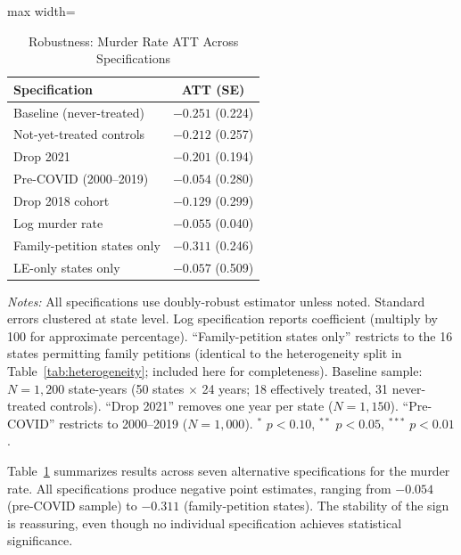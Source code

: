 \documentclass[12pt]{article}
\begin{document}
\begin{table}[H]
\centering
\caption{Robustness: Murder Rate ATT Across Specifications}
\label{tab:robustness}
\begin{adjustbox}{max width=\textwidth}
\begin{threeparttable}
\begin{tabular}{lc}
\toprule
Specification & ATT (SE) \\
\midrule
Baseline (never-treated) & $-0.251$ (0.224) \\
Not-yet-treated controls & $-0.212$ (0.257) \\
Drop 2021 & $-0.201$ (0.194) \\
Pre-COVID (2000--2019) & $-0.054$ (0.280) \\
Drop 2018 cohort & $-0.129$ (0.299) \\
Log murder rate & $-0.055$ (0.040) \\
Family-petition states only & $-0.311$ (0.246) \\
LE-only states only & $-0.057$ (0.509) \\
\bottomrule
\end{tabular}
\begin{tablenotes}[flushleft]
\small
\item \textit{Notes:} All specifications use \citet{callaway2021difference} doubly-robust estimator unless noted. Standard errors clustered at state level. Log specification reports coefficient (multiply by 100 for approximate percentage). ``Family-petition states only'' restricts to the 16 states permitting family petitions (identical to the heterogeneity split in Table~\ref{tab:heterogeneity}; included here for completeness). Baseline sample: $N = 1{,}200$ state-years (50 states $\times$ 24 years; 18 effectively treated, 31 never-treated controls). ``Drop 2021'' removes one year per state ($N = 1{,}150$). ``Pre-COVID'' restricts to 2000--2019 ($N = 1{,}000$). $^{*}$ $p<0.10$, $^{**}$ $p<0.05$, $^{***}$ $p<0.01$.
\end{tablenotes}
\end{threeparttable}
\end{adjustbox}
\end{table}

Table~\ref{tab:robustness} summarizes results across seven alternative specifications for the murder rate. All specifications produce negative point estimates, ranging from $-0.054$ (pre-COVID sample) to $-0.311$ (family-petition states). The stability of the sign is reassuring, even though no individual specification achieves statistical significance.
\end{document}

